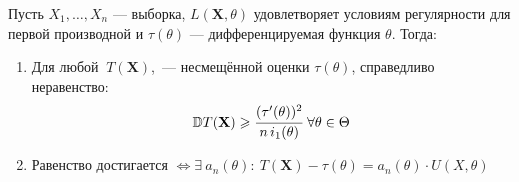 \begin{namedthm}
Пусть $X_1, \ldots, X_n$ — выборка, $L(\mathbf{X}, \theta)$ удовлетворяет условиям регулярности для первой производной и $\tau(\theta)$  —  дифференцируемая функция $\theta$. Тогда:
\begin{enumerate}
    \item Для любой $~T(\mathbf{X})$,~--- несмещённой оценки $\tau(\theta)$, справедливо неравенство:
    \begin{gather*}
        \mathbb{D} T(\mathbf{X}) \geqslant 
        \cfrac{(\tau'(\theta))^2}{n \, i_1(\theta)}
        ~\forall \theta \in \Theta%
    \end{gather*}
    
    \item Равенство достигается $\Leftrightarrow \exists~ a_n(\theta):~ T(\mathbf{X})-\tau(\theta)=a_{n}(\theta) \cdot U(X, \theta)$
\end{enumerate}
\end{namedthm}

